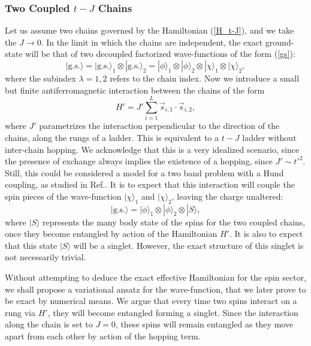 \documentclass[article,11pt]{revtex4}
\begin{document}
\subsubsection {Two Coupled $t-J$ Chains}

Let us assume two chains governed by the Hamiltonian (\ref{H_t-J}), and we take the $J \rightarrow 0$. In the limit in which the chains are independent, the exact ground-state will be that of two decoupled factorized wave-functions of the form (\ref{gs}):
\begin{equation}
|\mathrm{g.s.}\rangle=|\mathrm{g.s.}\rangle_1 \otimes |\mathrm{g.s.}\rangle_2=|\phi\rangle_1 \otimes |\phi\rangle_2 \otimes |\chi\rangle_1 \otimes |\chi\rangle_2,
\label{gs2}
\end{equation}
where the subindex $\lambda=1,2$ refers to the chain index.
Now we introduce a small but finite antiferromagnetic interaction between the chains of the form
\begin{equation}
H'=J'\sum_{i=1}^L  \vec{s}_{i,1} \cdot \vec{s}_{i,2},
\end{equation}
where $J'$ parametrizes the interaction perpendicular to the direction of the chains, along the rungs of a ladder. This is equivalent to a $t-J$ ladder without inter-chain hopping. We acknowledge that this is a very idealized scenario, since the presence of exchange always implies the existence of a hopping, since $J' \sim t'^2$. Still, this could be considered a model for a two band problem with a Hund coupling, as studied in Ref.\cite{Tsvelik}. It is to expect that this interaction will couple the spin pieces of the wave-function $|\chi\rangle_1$ and $|\chi\rangle_2$, leaving the charge unaltered:
\begin{equation}
|\mathrm{g.s.}\rangle=|\phi\rangle_1 \otimes |\phi\rangle_2 \otimes |S\rangle,
\label{gs3}
\end{equation}
where $|S\rangle$ represents the many body state of the spins for the two coupled chains, once they become entangled by action of the Hamiltonian $H'$.
It is also to expect that this state $|S\rangle$ will be a singlet. However, the exact structure of this singlet is not necessarily trivial. 

Without attempting to deduce the exact effective Hamiltonian for the spin sector, we shall propose a variational ansatz for the wave-function, that we later prove to be exact by numerical means. We argue that every time two spins interact on a rung via $H'$, they will become entangled forming a singlet. Since the interaction along the chain is set to $J=0$, these spins will remain entangled as they move apart from each other by action of the hopping term.
\end{document}
